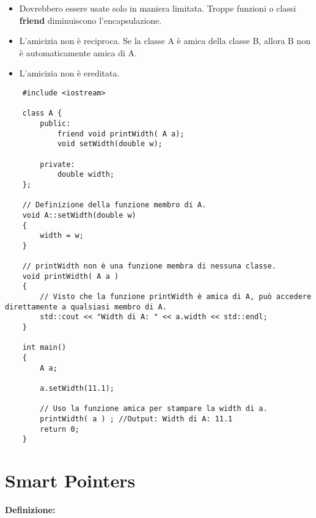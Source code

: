 \begin{itemize}
	\item \textsf{\small Dovrebbero essere usate solo in maniera limitata. Troppe funzioni o classi \textbf{friend} diminuiscono l'encapsulazione.}
	\item \textsf{\small L'amicizia non è reciproca. Se la classe A è amica della classe B, allora B non è automaticamente amica di A.}
	\item \textsf{\small L'amicizia non è ereditata.}
\end{itemize}

\begin{lstlisting}
	#include <iostream>
	
	class A {
		public:
			friend void printWidth( A a);
			void setWidth(double w);
			
		private:
			double width;
	};

	// Definizione della funzione membro di A.
	void A::setWidth(double w)
	{
		width = w;
	}

	// printWidth non è una funzione membra di nessuna classe.
	void printWidth( A a )
	{
		// Visto che la funzione printWidth è amica di A, può accedere direttamente a qualsiasi membro di A.
		std::cout << "Width di A: " << a.width << std::endl;
	}

	int main()
	{
		A a;
		
		a.setWidth(11.1);
		
		// Uso la funzione amica per stampare la width di a.
		printWidth( a ) ; //Output: Width di A: 11.1
		return 0;
	}
\end{lstlisting}


\newpage

\section{Smart Pointers}

\textsf{\small \textbf{Definizione: } } \\





